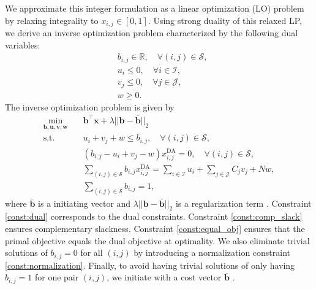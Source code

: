 \documentclass[11pt]{article}
\begin{document}
We approximate this integer formulation as a linear optimization (LO) problem by relaxing integrality to $x_{i,j} \in [0,1]$. Using strong duality of this relaxed LP, we derive an inverse optimization problem characterized by the following dual variables: 
\begin{align*}
    & b_{i,j} \in \mathbb{R} ,\quad \forall (i,j) \in\mathcal{S}, \\
    & u_i \le 0, \quad \forall i \in \mathcal{I}, \\
    & v_j \le 0, \quad \forall j \in \mathcal{J}, \\
    & w \ge 0. 
\end{align*}
The inverse optimization problem is given by 
\begin{align}
    \min_{\mathbf {b, u, v, w}} \quad & \mathbf b^\top \mathbf x + \lambda||\mathbf b - \mathbf{\overline b} ||_2 \label{const:inv_objective} \\ 
    \text{s.t.} \quad & u_i + v_j + w \le  b_{i,j}, \quad \forall (i,j) \in \mathcal{S}, \label{const:dual} \\
    & (b_{i,j} - u_i + v_j -w)x_{i,j}^{\text{DA}} = 0, \quad \forall (i,j) \in \mathcal{S}, \label{const:comp_slack}\\ 
    & \sum_{(i,j) \in \mathcal{S}} b_{i,j} x^{\text{DA}}_{i,j} = \sum_{i \in \mathcal{I}} u_i + \sum_{j \in \mathcal{J}} C_j v_j + Nw, \label{const:equal_obj} \\
    & \sum_{(i,j) \in \mathcal{S}} b_{i,j} = 1, \label{const:normalization}
\end{align}
where $\mathbf{\overline b}$ is a initiating vector and $\lambda||\mathbf b - \mathbf{\overline b} ||_2$ is a regularization term \citep{ahuja2001inverse, chan2025inverse}.
Constraint \eqref{const:dual} corresponds to the dual constraints. Constraint \eqref{const:comp_slack} ensures complementary slackness. Constraint \eqref{const:equal_obj} ensures that the primal objective equals the dual objective at optimality. 
We also eliminate trivial solutions of $b_{i,j} = 0$ for all $(i,j)$ by introducing a normalization constraint \eqref{const:normalization}. Finally, to avoid having trivial solutions of only having $b_{i,j} = 1$ for one pair $(i,j)$, we initiate with a cost vector $\mathbf{\overline b}$ \citep{ahuja2001inverse}.
\end{document}
